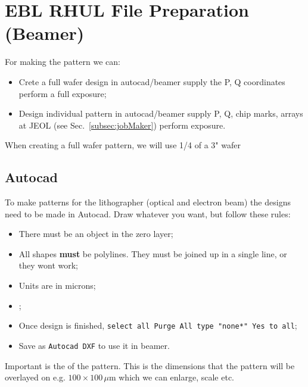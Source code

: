 
\newpage\section{EBL RHUL File Preparation (Beamer)
  \label{makeFile}}
For making the pattern we can:
\begin{itemize}
\item Crete a full wafer design in autocad/beamer  \ra supply the P, Q coordinates \ra perform
  a full exposure;
\item Design individual pattern in autocad/beamer \ra  supply P, Q, chip marks, arrays at JEOL
  (see Sec.~\ref{subsec:jobMaker}) \ra perform exposure.
\end{itemize}
  
When creating a full wafer pattern, we will use 1/4 of a 3" wafer 
  
 \subsection{Autocad}
 To make patterns for the lithographer (optical and electron beam) the designs need to be made
 in Autocad. Draw whatever you want, but follow these rules:
  
 \begin{itemize}
 \item There must be an object in the zero layer;
 \item All shapes \textbf{must} be polylines. They must be joined up in a single line, or they
   wont work;
 \item Units are in microns;
 \item {};
 \item Once design is finished, \texttt{select all \ra  Purge \ra All \ra type "none*" \ra Yes
     to all};
 \item Save as \texttt{Autocad DXF} to use it in beamer.
 \end{itemize}

 \begin{framed}\noindent
   Important is the  of the pattern. This is the dimensions that the pattern
   will be overlayed on e.g.  $ 100 \times 100\,\mu$m which we can enlarge, scale etc.
 
 \begin{center}
 \end{center}
 \end{framed}
 

